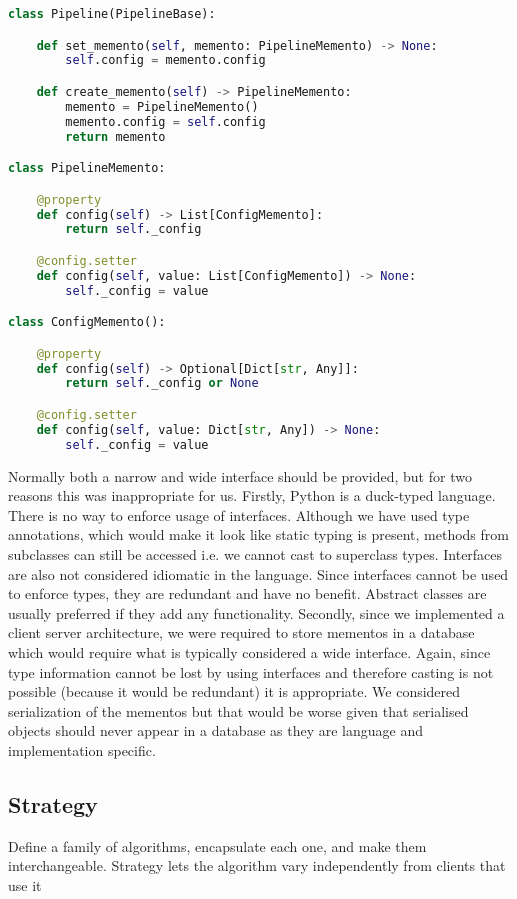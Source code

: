 \begin{lstlisting}[language=Python]
class Pipeline(PipelineBase):

	def set_memento(self, memento: PipelineMemento) -> None:
		self.config = memento.config

	def create_memento(self) -> PipelineMemento:
		memento = PipelineMemento()
		memento.config = self.config
		return memento

class PipelineMemento:

	@property
	def config(self) -> List[ConfigMemento]:
		return self._config

	@config.setter
	def config(self, value: List[ConfigMemento]) -> None:
		self._config = value

class ConfigMemento():

	@property
	def config(self) -> Optional[Dict[str, Any]]:
		return self._config or None

	@config.setter
	def config(self, value: Dict[str, Any]) -> None:
		self._config = value
\end{lstlisting}

Normally both a narrow and wide interface should be provided, but for two reasons this was inappropriate for us.
Firstly, Python is a duck-typed language. There is no way to enforce usage of interfaces. Although we have used
type annotations, which would make it look like static typing is present, methods from subclasses can still be
accessed i.e. we cannot cast to superclass types. Interfaces are also not considered idiomatic in the language.
Since interfaces cannot be used to enforce types, they are redundant and have no benefit.
Abstract classes are usually preferred if they add any functionality.
Secondly, since we implemented a client server architecture, we were required to store mementos in a database which
would require what is typically considered a wide interface. Again, since type information cannot be lost by
using interfaces and therefore casting is not possible (because it would be redundant) it is appropriate.
We considered serialization of the mementos but that would be worse given that serialised objects should never
appear in a database as they are language and implementation specific.

\subsection{Strategy}
Define a family of algorithms, encapsulate each one, and make them interchangeable. Strategy lets the
algorithm vary independently from clients that use it~\citep{oodesign}

